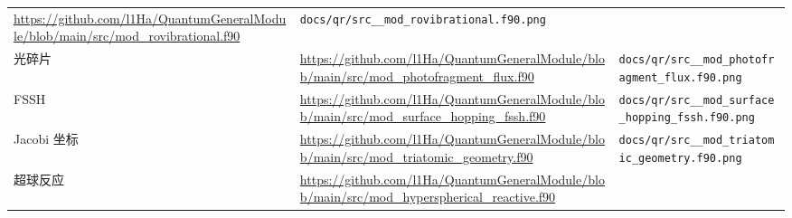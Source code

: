 \documentclass[
  a4paper,
]{ctexbook}
\begin{document}
\begin{longtable}[]{@{}lll@{}}
\begin{minipage}[t]{0.30\columnwidth}
\url{https://github.com/l1Ha/QuantumGeneralModule/blob/main/src/mod_rovibrational.f90}\strut
\end{minipage} & \begin{minipage}[t]{0.30\columnwidth}\raggedright
\texttt{docs/qr/src\_\_mod\_rovibrational.f90.png}\strut
\end{minipage}\tabularnewline
\begin{minipage}[t]{0.30\columnwidth}\raggedright
光碎片\strut
\end{minipage} & \begin{minipage}[t]{0.30\columnwidth}\raggedright
\url{https://github.com/l1Ha/QuantumGeneralModule/blob/main/src/mod_photofragment_flux.f90}\strut
\end{minipage} & \begin{minipage}[t]{0.30\columnwidth}\raggedright
\texttt{docs/qr/src\_\_mod\_photofragment\_flux.f90.png}\strut
\end{minipage}\tabularnewline
\begin{minipage}[t]{0.30\columnwidth}\raggedright
FSSH\strut
\end{minipage} & \begin{minipage}[t]{0.30\columnwidth}\raggedright
\url{https://github.com/l1Ha/QuantumGeneralModule/blob/main/src/mod_surface_hopping_fssh.f90}\strut
\end{minipage} & \begin{minipage}[t]{0.30\columnwidth}\raggedright
\texttt{docs/qr/src\_\_mod\_surface\_hopping\_fssh.f90.png}\strut
\end{minipage}\tabularnewline
\begin{minipage}[t]{0.30\columnwidth}\raggedright
Jacobi 坐标\strut
\end{minipage} & \begin{minipage}[t]{0.30\columnwidth}\raggedright
\url{https://github.com/l1Ha/QuantumGeneralModule/blob/main/src/mod_triatomic_geometry.f90}\strut
\end{minipage} & \begin{minipage}[t]{0.30\columnwidth}\raggedright
\texttt{docs/qr/src\_\_mod\_triatomic\_geometry.f90.png}\strut
\end{minipage}\tabularnewline
\begin{minipage}[t]{0.30\columnwidth}\raggedright
超球反应\strut
\end{minipage} & \begin{minipage}[t]{0.30\columnwidth}\raggedright
\url{https://github.com/l1Ha/QuantumGeneralModule/blob/main/src/mod_hyperspherical_reactive.f90}\strut

\end{minipage}
\end{longtable}
\end{document}
